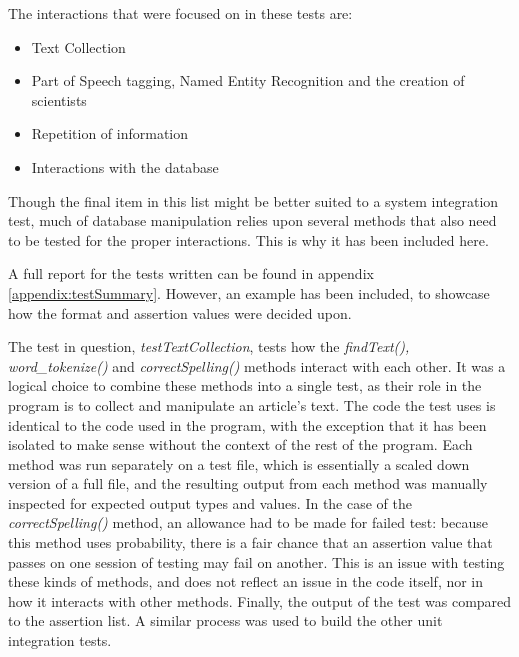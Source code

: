 \documentclass[11pt,a4paper]{book}
\begin{document}
The interactions that were focused on in these tests are:
\begin{itemize}
	\item Text Collection
	\item Part of Speech tagging, Named Entity Recognition and the creation of scientists
	\item Repetition of information
	\item Interactions with the database
\end{itemize}
Though the final item in this list might be better suited to a system integration test, much of database manipulation relies upon several methods that also need to be tested for the proper interactions. This is why it has been included here. 

A full report for the tests written can be found in appendix \ref{appendix:testSummary}. However, an example has been included, to showcase how the format and assertion values were decided upon. 

The test in question, \textit{testTextCollection}, tests how the \textit{findText(), word\_tokenize()} and \textit{correctSpelling()} methods interact with each other. It was a logical choice to combine these methods into a single test, as their role in the program is to collect and manipulate an article's text. The code the test uses is identical to the code used in the program, with the exception that it has been isolated to make sense without the context of the rest of the program. Each method was run separately on a test file, which is essentially a scaled down version of a full file, and the resulting output from each method was manually inspected for expected output types and values. In the case of the \textit{correctSpelling()} method, an allowance had to be made for failed test: because this method uses probability, there is a fair chance that an assertion value that passes on one session of testing may fail on another. This is an issue with testing these kinds of methods, and does not reflect an issue in the code itself, nor in how it interacts with other methods. Finally, the output of the test was compared to the assertion list. A similar process was used to build the other unit integration tests. 
\end{document}
